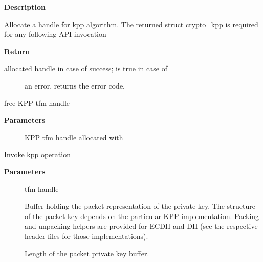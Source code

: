 \documentclass[a4paper,8pt,english]{sphinxmanual}
\begin{document}
\textbf{Description}

Allocate a handle for kpp algorithm. The returned struct crypto\_kpp
is required for any following API invocation

\textbf{Return}
\begin{description}
\item[{allocated handle in case of success;  is true in case of}] \leavevmode
an error,  returns the error code.

\end{description}

\begin{fulllineitems}
\label{crypto/api-kpp:c.crypto_free_kpp}
free KPP tfm handle

\end{fulllineitems}


\textbf{Parameters}
\begin{description}
\item[{}] \leavevmode
KPP tfm handle allocated with {\hyperref[crypto/api\string-kpp:c.crypto_alloc_kpp]{\emph{}}}

\end{description}

\begin{fulllineitems}
\label{crypto/api-kpp:c.crypto_kpp_set_secret}
Invoke kpp operation

\end{fulllineitems}


\textbf{Parameters}
\begin{description}
\item[{}] \leavevmode
tfm handle

\item[{}] \leavevmode
Buffer holding the packet representation of the private
key. The structure of the packet key depends on the particular
KPP implementation. Packing and unpacking helpers are provided
for ECDH and DH (see the respective header files for those
implementations).

\item[{}] \leavevmode
Length of the packet private key buffer.

\end{description}
\end{document}
